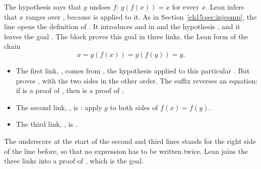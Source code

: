 The hypothesis  says that $g$ undoes $f$: $g(f(x))=x$ for every $x$. Lean infers that $x$ ranges over , because  is applied to it. As in Section~\ref{ch15:sec:injcomp}, the line  opens the definition of . It introduces  and  in  and the hypothesis , and it leaves the goal . The  block proves this goal in three links, the Lean form of the chain
\[
x=g(f(x))=g(f(y))=y.
\]
\begin{itemize}
\item The first link, , comes from , the hypothesis applied to this particular . But  proves , with the two sides in the other order. The suffix  reverses an equation: if  is a proof of , then  is a proof of .
\item The second link, , is : apply $g$ to both sides of $f(x)=f(y)$.
\item The third link, , is .
\end{itemize}
The underscore at the start of the second and third lines stands for the right side of the line before, so that no expression has to be written twice. Lean joins the three links into a proof of , which is the goal.
